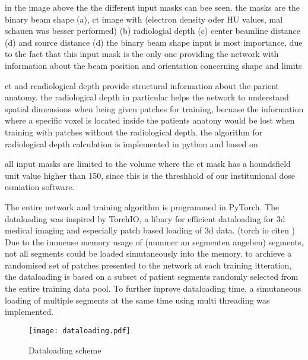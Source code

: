in the image above the the different input masks can bee seen. the masks are the binary beam shape (a), ct image with (electron density oder HU values, mal schauen was besser performed) (b) radiologial depth (c) center beamline distance (d) and source distance (d) 
the binary beam shape input is most importance, due to the fact that this input mask is the only one providing the network with information about the beam position and orientation concerning shape and limits

ct and readiological depth provide structural information about the parient anatomy. the radiological depth in particular helps the network to understand spatial dimensions when being given patches for training, becuase the information where a specific voxel is located inside the patients anatony would be lost when training with patches without the radiological depth. the algorithm for radiological depth calculation is implemented in python and based on  \cite{siddon_fast_1985}

all input masks are limited to the volume where the ct mask has a houndsfield unit value higher than 150, since this is the threshhold of our institunional dose esmiation software.

The entire network and training algorithm is programmed in PyTorch. The dataloading was inspired by TorchIO, a libary for efficient dataloading for 3d medical imaging and especially patch based loading of 3d data. (torch io citen \cite{perez-garcia_torchio_2021}) Due to the immense memory usage of (nummer an segmenten angeben) segments, not all segments could be loaded simutaneously into the memory. to archieve a randomised set of patches presented to the network at each training itteration, the dataloading is based on a subset of patient segments randomly selected from the entire training data pool. To further inprove dataloading time, a simutaneous loading of multiple segments at the same time using multi threading was implemented. 

\begin{figure}
    \centering
    \texttt{[image: dataloading.pdf]}
    \caption{Dataloading scheme}\label{fig: dataloading}
\end{figure}

%     

